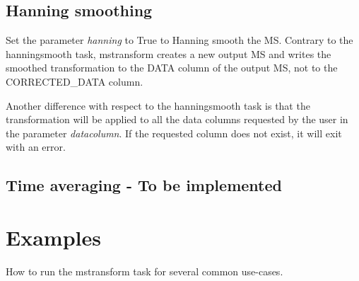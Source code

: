 \subsection{Hanning smoothing}
Set the parameter {\it hanning} to True to Hanning smooth the MS. Contrary to the
hanningsmooth task, mstransform creates a new output MS and writes the smoothed transformation
to the DATA column of the output MS, not to the CORRECTED_DATA column.

Another difference with respect to the hanningsmooth task is that the transformation will be 
applied to all the data columns requested by the user in the parameter {\it datacolumn}. If the 
requested column does not exist, it will exit with an error. 

\subsection{Time averaging - To be implemented}



\section{Examples}\label{Sec:Examples}
How to run the mstransform task for several common use-cases.

